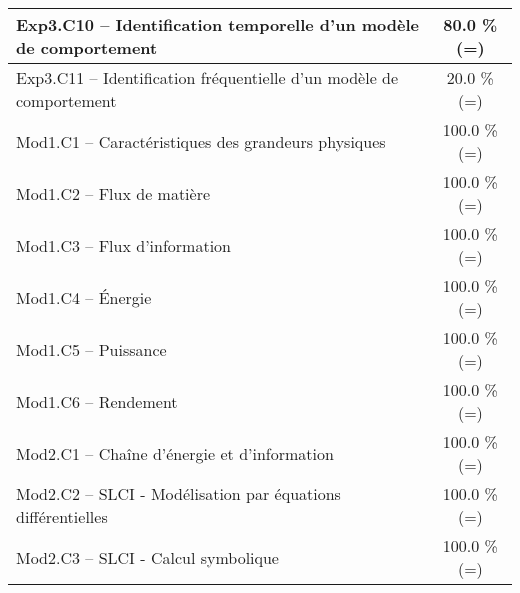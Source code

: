 \begin{center}
\begin{tabular}{|p{.7\linewidth}|c|}
Exp3.C10 -- Identification temporelle d’un modèle de comportement&80.0 \%(=)\\ \hline 
Exp3.C11 -- Identification fréquentielle d’un modèle de comportement&20.0 \%(=)\\ \hline 
Mod1.C1 -- Caractéristiques des grandeurs physiques&100.0 \%(=)\\ \hline 
Mod1.C2 -- Flux de matière&100.0 \%(=)\\ \hline 
Mod1.C3 -- Flux d’information&100.0 \%(=)\\ \hline 
Mod1.C4 -- Énergie&100.0 \%(=)\\ \hline 
Mod1.C5 -- Puissance&100.0 \%(=)\\ \hline 
Mod1.C6 -- Rendement&100.0 \%(=)\\ \hline 
Mod2.C1 -- Chaîne d’énergie et d'information&100.0 \%(=)\\ \hline 
Mod2.C2 -- SLCI - Modélisation par équations différentielles&100.0 \%(=)\\ \hline 
Mod2.C3 -- SLCI - Calcul symbolique&100.0 \%(=)\\ \hline 
\end{tabular} 
\end{center} 
\normalsize 
 
